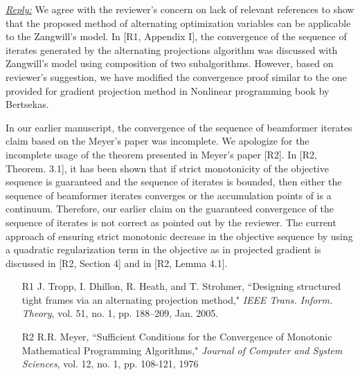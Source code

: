 \begin{itemize}
	\vspace{1eM}
	\underline{\textit{Reply:}} We agree with the reviewer's concern on lack of relevant references to show that the proposed method of alternating optimization variables can be applicable to the Zangwill's model. In [R1, Appendix I], the convergence of the sequence of iterates generated by the alternating projections algorithm was discussed with Zangwill's model using composition of two subalgorithms. However, based on reviewer's suggestion, we have modified the convergence proof similar to the one provided for gradient projection method in Nonlinear programming book by Bertsekas.	
	
	In our earlier manuscript, the convergence of the sequence of beamformer iterates claim based on the Meyer's paper was incomplete. We apologize for the incomplete usage of the theorem presented in Meyer's paper [R2]. In [R2, Theorem. 3.1], it has been shown that if strict monotonicity of the objective sequence is guaranteed and the sequence of iterates is bounded, then either the sequence of beamformer iterates converges or the accumulation points of  is a continuum. Therefore, our earlier claim on the guaranteed convergence of the sequence of iterates is not correct as pointed out by the reviewer. The current approach of ensuring strict monotonic decrease in the objective sequence by using a quadratic regularization term in the objective as in projected gradient is discussed in [R2, Section 4] and in [R2, Lemma 4.1]. 
	
	\begin{itemize}
		\item[R1]  J. Tropp, I. Dhillon, R. Heath, and T. Strohmer, ``Designing structured tight frames via an alternating projection method," \emph{IEEE Trans. Inform. Theory}, vol. 51, no. 1, pp. 188–209, Jan. 2005.
		\item[R2] R.R. Meyer, ``Sufficient Conditions for the Convergence of Monotonic Mathematical Programming Algorithms," \emph{Journal of Computer and System Sciences}, vol. 12, no. 1, pp. 108-121, 1976
	\end{itemize}
	
\end{itemize}